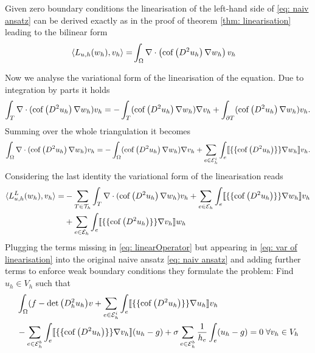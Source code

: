 Given zero boundary conditions the linearisation of the left-hand side of \eqref{eq: naiv ansatz} can be derived exactly as in the proof of theorem \ref{thm: linearisation} leading to the bilinear form
\begin{align}
\langle L_{u,h}(w_h),v_h\rangle =& \int_{\Omega} \nabla \cdot \left( \operatorname{cof} \left( D^2 u_h  \right) \nabla w_h \right) v_h
\label{eq: linearOperator}
\end{align}

Now we analyse the variational form of the linearisation of the \MA equation. Due to integration by parts it holds
\begin{align*}
  \int_T \nabla \cdot (\operatorname{cof} \left( D^2 u_h \right) \nabla w_h) v_h= -\int_T (\operatorname{cof} \left( D^2 u_h \right) \nabla w_h) \nabla v_h+ \int_{\partial T} (\operatorname{cof} \left( D^2 u_h \right) \nabla w_h) v_h.
\end{align*}
Summing over the whole triangulation it becomes
\begin{align*}
  \int_\Omega \nabla \cdot (\operatorname{cof} \left( D^2 u_h \right) \nabla w_h) v_h= -\int_\Omega (\operatorname{cof} \left( D^2 u_h \right) \nabla w_h) \nabla v_h+ \sum_{e \in \mathcal{E}_h^i} \int_{e} \llbracket \{\{\operatorname{cof} \left( D^2 u_h \right) \}\} \nabla w_h\rrbracket v_h.
\end{align*}
Considering the last identity the variational form of the linearisation reads
\begin{align}
	\langle L^L_{u,h}(w_h),v_h\rangle 
	    =&- \sum_{T \in \mathcal{T}_h}  \int_T \nabla \cdot (\operatorname{cof} \left( D^2 u_h \right) \nabla w_h) v_h
	    + \sum_{e \in \mathcal{E}_h} \int_{e} \llbracket \{\{\operatorname{cof} \left( D^2 u_h \right) \}\} \nabla w_h\rrbracket v_h \nonumber \\
	    &+ \sum_{e \in \mathcal{E}_h} \int_{e} \llbracket \{\{\operatorname{cof} \left( D^2 u_h \right) \}\} \nabla v_h\rrbracket w_h \label{eq: var of linearisation}
\end{align}
Plugging the terms missing in \eqref{eq: linearOperator} but appearing in \eqref{eq: var of linearisation} into the original naive ansatz \eqref{eq: naiv ansatz} and adding further terms to enforce weak boundary conditions they formulate the problem: Find $u_h \in V_h$ such that
\begin{align}
\begin{split}
	&\int_{\Omega} (f-\det{\left(D^2_h u_h\right)} v 
	+ \sum_{e \in \mathcal{E}_h^i} \int_{e} \llbracket \{\{\operatorname{cof} \left( D^2 u_h \right) \}\} \nabla u_h\rrbracket v_h \\
	&- \sum_{e \in \mathcal{E}_h^b} \int_{e} \llbracket \{\{\operatorname{cof} \left( D^2 u_h \right) \}\} \nabla v_h\rrbracket (u_h -g) 
	+ \sigma  \sum_{e \in \mathcal{E}_h^b} \frac 1 {h_e} \int_{e} (u_h -g)  = 0 \; \forall v_h \in V_h \label{eq: brenner method}
\end{split}
\end{align}
